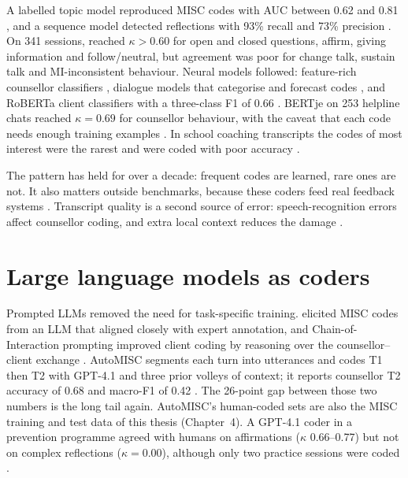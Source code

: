 A labelled topic model reproduced MISC codes with AUC between 0.62 and 0.81 \citep{atkins2014scaling}, and a sequence model detected reflections with 93\% recall and 73\% precision \citep{can2016sounds}. On 341 sessions, \citet{tanana2016comparison} reached $\kappa > 0.60$ for open and closed questions, affirm, giving information and follow/neutral, but agreement was poor for change talk, sustain talk and MI-inconsistent behaviour. Neural models followed: feature-rich counsellor classifiers \citep{perezrosas2017predicting}, dialogue models that categorise and forecast codes \citep{cao2019observing}, and RoBERTa client classifiers with a three-class F1 of 0.66 \citep{tavabi2021analysis}. BERTje on 253 helpline chats reached $\kappa = 0.69$ for counsellor behaviour, with the caveat that each code needs enough training examples \citep{pellemans2024automated}. In school coaching transcripts the codes of most interest were the rarest and were coded with poor accuracy \citep{pas2025leveraging}.

The pattern has held for over a decade: frequent codes are learned, rare ones are not. It also matters outside benchmarks, because these coders feed real feedback systems \citep{imel2019design,flemotomos2022automated}. Transcript quality is a second source of error: speech-recognition errors affect counsellor coding, and extra local context reduces the damage \citep{min2021evaluating}.

\section{Large language models as coders}
\label{sec:rw-llm}

Prompted LLMs removed the need for task-specific training. \citet{sun2024bimisc} elicited MISC codes from an LLM that aligned closely with expert annotation, and Chain-of-Interaction prompting improved client coding by reasoning over the counsellor--client exchange \citep{han2024chain}. AutoMISC segments each turn into utterances and codes T1 then T2 with GPT-4.1 and three prior volleys of context; it reports counsellor T2 accuracy of 0.68 and macro-F1 of 0.42 \citep{ali2025automisc}. The 26-point gap between those two numbers is the long tail again. AutoMISC's human-coded sets are also the MISC training and test data of this thesis (Chapter~4). A GPT-4.1 coder in a prevention programme agreed with humans on affirmations ($\kappa$ 0.66--0.77) but not on complex reflections ($\kappa = 0.00$), although only two practice sessions were coded \citep{cardozo2026automating}.

